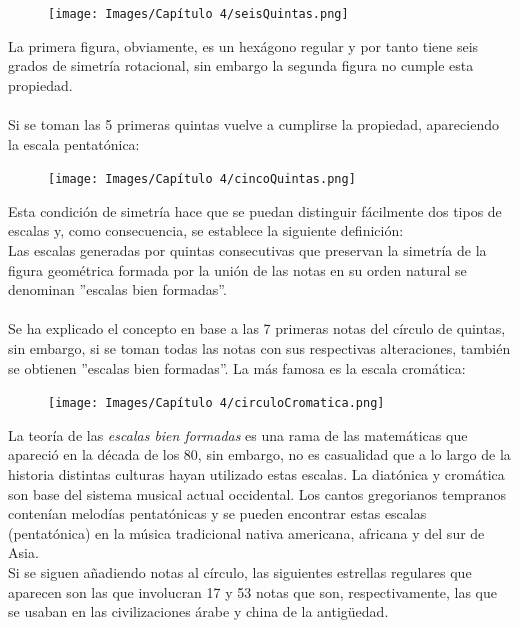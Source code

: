 \documentclass[a4paper, openright, 11pt, titlepage]{report}
\theoremstyle{definition}\newtheorem{defin}[propo]{Definition}
\theoremstyle{definition}\newtheorem{obser}[propo]{Remark}
\theoremstyle{definition}\newtheorem{ejem}[propo]{Ejemplo}
\theoremstyle{definition}\newtheorem{algoritmo}[propo]{Algoritmo}
\begin{document}
\begin{figure}[H]
    \centering
    \texttt{[image: Images/Capítulo 4/seisQuintas.png]}
\end{figure}
La primera figura, obviamente, es un hexágono regular y por tanto tiene seis grados de simetría rotacional, sin embargo la segunda figura no cumple esta propiedad.\\\\
Si se toman las 5 primeras quintas vuelve a cumplirse la propiedad, apareciendo la escala pentatónica:
\begin{figure}[H]
    \centering
    \texttt{[image: Images/Capítulo 4/cincoQuintas.png]}
\end{figure}
Esta condición de simetría hace que se puedan distinguir fácilmente dos tipos de escalas y, como consecuencia, se establece la siguiente definición:\\
Las escalas generadas por quintas consecutivas que preservan la simetría de la figura geométrica formada por la unión de las notas en su orden natural se denominan ''escalas bien formadas''.\\\\
Se ha explicado el concepto en base a las 7 primeras notas del círculo de quintas, sin embargo, si se toman todas las notas con sus respectivas alteraciones, también se obtienen ''escalas bien formadas''. La más famosa es la escala cromática: 
\begin{figure}[H]
    \centering
    \texttt{[image: Images/Capítulo 4/circuloCromatica.png]}
\end{figure}
La teoría de las \textit{escalas bien formadas} es una rama de las matemáticas que apareció en la década de los 80, sin embargo, no es casualidad que a lo largo de la historia distintas culturas hayan utilizado estas escalas. La diatónica y cromática son base del sistema musical actual occidental. Los cantos gregorianos tempranos contenían melodías pentatónicas y se pueden encontrar estas escalas (pentatónica) en la música tradicional nativa americana, africana y del sur de Asia.\\
Si se siguen añadiendo notas al círculo, las siguientes estrellas regulares que aparecen son las que involucran 17 y 53 notas que son, respectivamente, las que se usaban en las civilizaciones árabe y china de la antigüedad.
\end{document}
